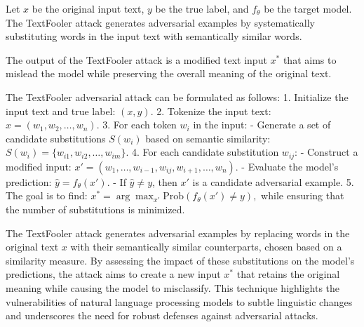 Let \( x \) be the original input text, \( y \) be the true label, and \( f_{\theta} \) be the target model. The TextFooler attack generates adversarial examples by systematically substituting words in the input text with semantically similar words.

The output of the TextFooler attack is a modified text input \( x^* \) that aims to mislead the model while preserving the overall meaning of the original text.

The TextFooler adversarial attack can be formulated as follows:
1. Initialize the input text and true label:
   $
   (x, y).
   $
2. Tokenize the input text:
   $
   x = (w_1, w_2, \ldots, w_n).
   $
3. For each token \( w_i \) in the input:
   - Generate a set of candidate substitutions \( S(w_i) \) based on semantic similarity:
   $
   S(w_i) = \{w_{i1}, w_{i2}, \ldots, w_{im}\}.
   $
4. For each candidate substitution \( w_{ij} \):
   - Construct a modified input:
   $
   x' = (w_1, \ldots, w_{i-1}, w_{ij}, w_{i+1}, \ldots, w_n).
   $
   - Evaluate the model's prediction:
   $
   \hat{y} = f_{\theta}(x').
   $
   - If \( \hat{y} \neq y \), then \( x' \) is a candidate adversarial example.
5. The goal is to find:
   $
   x^* = \arg\max_{x'} \text{Prob}(f_{\theta}(x') \neq y),
   $
   while ensuring that the number of substitutions is minimized.

The TextFooler attack generates adversarial examples by replacing words in the original text \( x \) with their semantically similar counterparts, chosen based on a similarity measure. By assessing the impact of these substitutions on the model's predictions, the attack aims to create a new input \( x^* \) that retains the original meaning while causing the model to misclassify. This technique highlights the vulnerabilities of natural language processing models to subtle linguistic changes and underscores the need for robust defenses against adversarial attacks.
